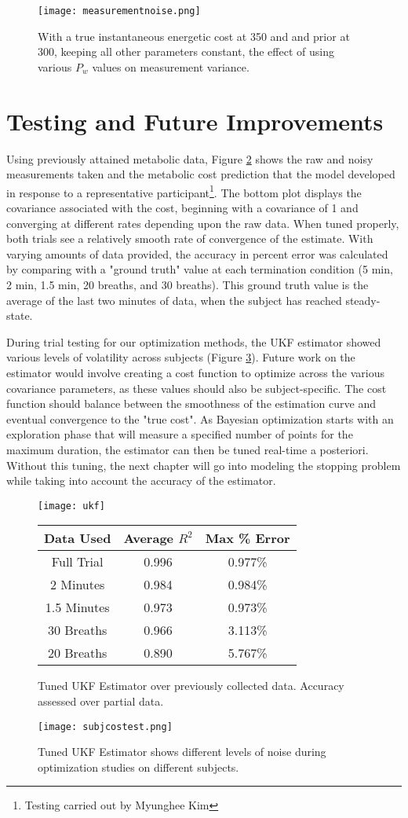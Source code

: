 \begin{figure}[t]
\centering
\texttt{[image: measurementnoise.png]}
\caption{With a true instantaneous energetic cost at 350 and and prior at 300, keeping all other parameters constant, the effect of using various $P_w$ values on measurement variance.}
\label{fig:measurementnoise}
\end{figure}

\section{Testing and Future Improvements}
Using previously attained metabolic data, Figure \ref{fig:ukftuned} shows the raw and noisy measurements taken and the metabolic cost prediction that the model developed in response to a representative participant\footnote{Testing carried out by Myunghee Kim}. The bottom plot displays the covariance associated with the cost, beginning with a covariance of 1 and converging at different rates depending upon the raw data. When tuned properly, both trials see a relatively smooth rate of convergence of the estimate. With varying amounts of data provided, the accuracy in percent error was calculated by comparing with a "ground truth" value at each termination condition (5 min, 2 min, 1.5 min, 20 breaths, and 30 breaths). This ground truth value is the average of the last two minutes of data, when the subject has reached steady-state.

During trial testing for our optimization methods, the UKF estimator showed various levels of volatility across subjects (Figure \ref{fig:subjcostest}). Future work on the estimator would involve creating a cost function to optimize across the various covariance parameters, as these values should also be subject-specific. The cost function should balance between the smoothness of the estimation curve and eventual convergence to the "true cost". As Bayesian optimization starts with an exploration phase that will measure a specified number of points for the maximum duration, the estimator can then be tuned real-time a posteriori. Without this tuning, the next chapter will go into modeling the stopping problem while taking into account the accuracy of the estimator. 

\begin{figure}[t]
\centering
\texttt{[image: ukf]}

\begin{tabular}{ |c|c|c| } 
 \hline
 Data Used & Average $R^2$ & Max \% Error \\ 
 \hline
 Full Trial & 0.996 & 0.977\% \\ 
 2 Minutes & 0.984 & 0.984\% \\ 
 1.5 Minutes & 0.973 & 0.973\% \\ 
 30 Breaths & 0.966 & 3.113\% \\ 
 20 Breaths & 0.890 & 5.767\% \\ 
 \hline
\end{tabular}%
\caption{Tuned UKF Estimator over previously collected data. Accuracy assessed over partial data.}
\label{fig:ukftuned}
\end{figure}

\begin{figure}[h]
\centering
\texttt{[image: subjcostest.png]}
\caption{Tuned UKF Estimator shows different levels of noise during optimization studies on different subjects.}
\label{fig:subjcostest}
\end{figure}